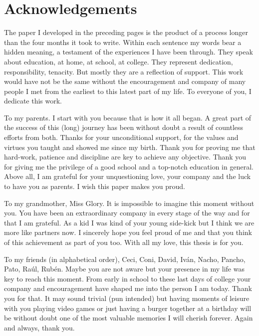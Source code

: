 \documentclass[english, a4paper, 12pt]{article}
\begin{document}

\newpage
\section*{Acknowledgements}
The paper I developed in the preceding pages is the product of a process longer than the four months it took to write. Within each sentence my words bear a hidden meaning, a testament of the experiences I have been through.  They speak about education, at home, at school, at college. They represent dedication, responsibility, tenacity. But mostly they are a reflection of support. This work would have not be the same without the encouragement and company of many people I met from the earliest to this latest part of my life. To everyone of you, I dedicate this work.

To my parents. I start with you because that is how it all began. A great part of the success of this (long) journey has been without doubt a result of countless efforts from both. Thanks for your unconditional support, for the values and virtues you taught and showed me since my birth. Thank you for proving me that hard-work, patience and discipline are key to achieve any objective. Thank you for giving me the privilege of a good school and a top-notch education in general. Above all, I am grateful for your unquestioning love, your company and the luck to have you as parents. I wish this paper makes you proud.

To my grandmother, Miss Glory. It is impossible to imagine this moment without you. You have been an extraordinary company in every stage of the way and for that I am grateful. As a kid I was kind of your young side-kick but I think we are more like partners now. I sincerely hope you feel proud of me and that you think of this achievement as part of you too. With all my love, this thesis is for you. 

To my friends (in alphabetical order), Ceci, Coni, David, Iván, Nacho, Pancho, Pato, Raúl, Rubén. Maybe you are not aware but your presence in my life was key to reach this moment. From early in school to these last days of college your company and encouragement have shaped me into the person I am today. Thank you for that. It may sound trivial (pun intended) but having moments of leisure with you playing video games or just having a burger together at a birthday will be without doubt one of the most valuable memories I will cherish forever. Again and always, thank you.
\end{document}
